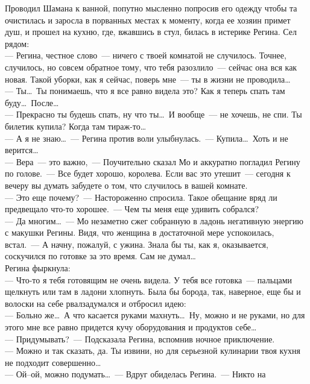 Проводил Шамана к ванной, попутно мысленно попросив его одежду чтобы та 
очистилась и заросла в порванных местах к моменту, когда ее хозяин примет душ, 
и прошел на кухню, где, вжавшись в стул, билась в истерике Регина. Сел рядом:\\
--- Регина, честное слово~--- ничего с твоей комнатой не случилось. Точнее, 
случилось, но совсем обратное тому, что тебя разозлило~--- сейчас она вся как 
новая. Такой уборки, как я сейчас, поверь мне~--- ты в жизни не проводила\ldots\\
--- Ты\ldots\ Ты понимаешь, что я все равно видела это? Как я теперь спать там 
буду\ldots\ После\ldots\\
--- Прекрасно ты будешь спать, ну что ты\ldots\ И вообще~--- не хочешь, не спи. 
Ты билетик купила? Когда там тираж-то\ldots\\
--- А я не знаю\ldots~--- Регина против воли улыбнулась.~--- Купила\ldots\ Хоть и 
не верится\ldots\\
--- Вера~--- это важно,~--- Поучительно сказал Мо и аккуратно погладил Регину по 
голове.~--- Все будет хорошо, королева. Если вас это утешит~--- сегодня к 
вечеру вы думать забудете о том, что случилось в вашей комнате.\\
--- Это еще почему?~--- Настороженно спросила. Такое обещание вряд ли предвещало 
что-то хорошее.~--- Чем ты меня еще удивить собрался?\\
--- Да многим\ldots~--- Мо незаметно сжег собранную в ладонь негативную энергию 
с макушки Регины. Видя, что женщина в достаточной мере успокоилась, встал.~--- А 
начну, пожалуй, с ужина. Знала бы ты, как я, оказывается, соскучился по готовке 
за это время. Сам не думал\ldots\\
Регина фыркнула:\\
--- Что-то я тебя готовящим не очень видела. У тебя все готовка~--- пальцами 
щелкнуть или там в ладони хлопнуть. Была бы борода, так, наверное, еще бы и 
волоски на себе рвал задумался и отбросил идею:\\
--- Больно же\ldots\ А что касается руками махнуть\ldots\ Ну, можно и не руками, 
но для этого мне все равно придется кучу оборудования и продуктов себе\ldots\\
--- Придумывать?~--- Подсказала Регина, вспомнив ночное приключение.\\
--- Можно и так сказать, да. Ты извини, но для серьезной кулинарии твоя кухня не 
подходит совершенно\ldots\\
--- Ой--ой, можно подумать\ldots~--- Вдруг обиделась Регина.~--- Никто на 
